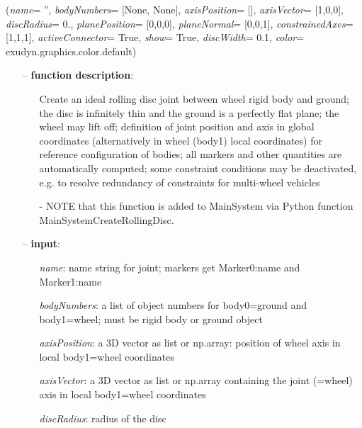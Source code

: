%
\begin{flushleft}
\label{sec:mainsystemextensions:CreateRollingDisc}
({\it name}= '', {\it bodyNumbers}= [None, None], {\it axisPosition}= [], {\it axisVector}= [1,0,0], {\it discRadius}= 0., {\it planePosition}= [0,0,0], {\it planeNormal}= [0,0,1], {\it constrainedAxes}= [1,1,1], {\it activeConnector}= True, {\it show}= True, {\it discWidth}= 0.1, {\it color}= exudyn.graphics.color.default)
\end{flushleft}
\setlength{\itemindent}{0.7cm}
\begin{itemize}[leftmargin=0.7cm]
\item[--]
{\bf function description}: \vspace{-6pt}
\begin{itemize}[leftmargin=1.2cm]
\setlength{\itemindent}{-0.7cm}
\item[]Create an ideal rolling disc joint between wheel rigid body and ground; the disc is infinitely thin and the ground is a perfectly flat plane; the wheel may lift off; definition of joint position and axis in global coordinates (alternatively in wheel (body1) local coordinates) for reference configuration of bodies; all markers and other quantities are automatically computed; some constraint conditions may be deactivated, e.g. to resolve redundancy of constraints for multi-wheel vehicles
\item[]- NOTE that this function is added to MainSystem via Python function MainSystemCreateRollingDisc.
\end{itemize}
\item[--]
{\bf input}: \vspace{-6pt}
\begin{itemize}[leftmargin=1.2cm]
\setlength{\itemindent}{-0.7cm}
\item[]{\it name}: name string for joint; markers get Marker0:name and Marker1:name
\item[]{\it bodyNumbers}: a list of object numbers for body0=ground and body1=wheel; must be rigid body or ground object
\item[]{\it axisPosition}: a 3D vector as list or np.array: position of wheel axis in local body1=wheel coordinates
\item[]{\it axisVector}: a 3D vector as list or np.array containing the joint (=wheel) axis in local body1=wheel coordinates
\item[]{\it discRadius}: radius of the disc

\end{itemize}
\end{itemize}
